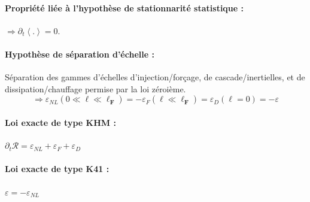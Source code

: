 {\begin{minipage}[c]{\linewidth}
\paragraph{Propriété liée à l'hypothèse de stationnarité statistique : } $\Rightarrow \partial_t \left<.\right> = 0$.

\paragraph{Hypothèse de séparation d'échelle : } Séparation des gammes d'échelles d'injection/forçage, de cascade/inertielles, et de dissipation/chauffage permise par la loi zéroième.
\begin{equation*}
\Rightarrow  \varepsilon_{NL}(0 \ll \boldsymbol{\ell} \ll \boldsymbol{\ell_F} ) = - \varepsilon_{F}(\boldsymbol{\ell} \ll \boldsymbol{\ell_F} ) = \varepsilon_{D}(\boldsymbol{\ell}=0) = - \varepsilon
\end{equation*}

\paragraph{Loi exacte de type \acs{KHM} : } $\partial_t \mathcal{R} = \varepsilon_{NL} + \varepsilon_{F} + \varepsilon_{D}$

\paragraph{Loi exacte de type \acs{K41} : } $\varepsilon = -\varepsilon_{NL}$

\end{minipage}}
